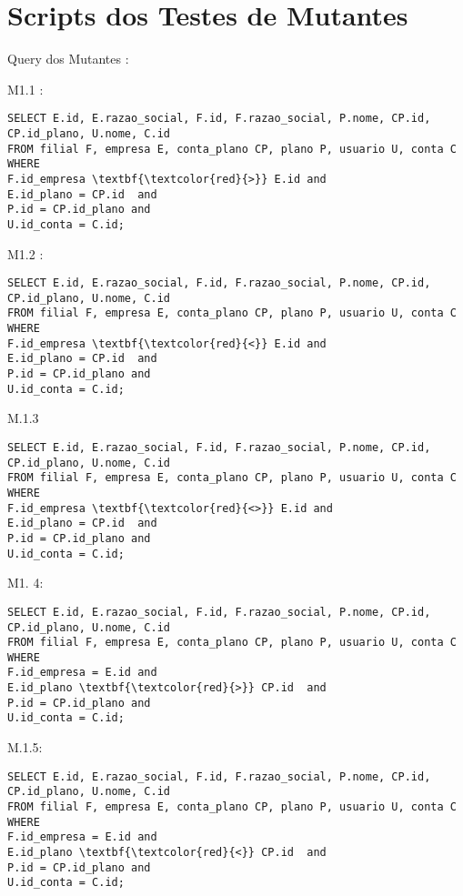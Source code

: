 \chapter{Scripts dos Testes de  Mutantes}
\label{apend:D}

Query dos Mutantes :

M1.1 : 
\begin{Verbatim}
SELECT E.id, E.razao_social, F.id, F.razao_social, P.nome, CP.id, CP.id_plano, U.nome, C.id
FROM filial F, empresa E, conta_plano CP, plano P, usuario U, conta C
WHERE 
F.id_empresa \textbf{\textcolor{red}{>}} E.id and
E.id_plano = CP.id  and
P.id = CP.id_plano and
U.id_conta = C.id;
\end{Verbatim}



M1.2 : 
\begin{Verbatim}
SELECT E.id, E.razao_social, F.id, F.razao_social, P.nome, CP.id, CP.id_plano, U.nome, C.id
FROM filial F, empresa E, conta_plano CP, plano P, usuario U, conta C
WHERE 
F.id_empresa \textbf{\textcolor{red}{<}} E.id and
E.id_plano = CP.id  and
P.id = CP.id_plano and
U.id_conta = C.id;
\end{Verbatim}


M.1.3
\begin{Verbatim}
SELECT E.id, E.razao_social, F.id, F.razao_social, P.nome, CP.id, CP.id_plano, U.nome, C.id
FROM filial F, empresa E, conta_plano CP, plano P, usuario U, conta C
WHERE 
F.id_empresa \textbf{\textcolor{red}{<>}} E.id and
E.id_plano = CP.id  and
P.id = CP.id_plano and
U.id_conta = C.id;
\end{Verbatim}





M1. 4: 
\begin{Verbatim}
SELECT E.id, E.razao_social, F.id, F.razao_social, P.nome, CP.id, CP.id_plano, U.nome, C.id
FROM filial F, empresa E, conta_plano CP, plano P, usuario U, conta C
WHERE 
F.id_empresa = E.id and
E.id_plano \textbf{\textcolor{red}{>}} CP.id  and
P.id = CP.id_plano and
U.id_conta = C.id;

\end{Verbatim}


M.1.5:
\begin{Verbatim}
SELECT E.id, E.razao_social, F.id, F.razao_social, P.nome, CP.id, CP.id_plano, U.nome, C.id
FROM filial F, empresa E, conta_plano CP, plano P, usuario U, conta C
WHERE 
F.id_empresa = E.id and
E.id_plano \textbf{\textcolor{red}{<}} CP.id  and
P.id = CP.id_plano and
U.id_conta = C.id;
\end{Verbatim}



